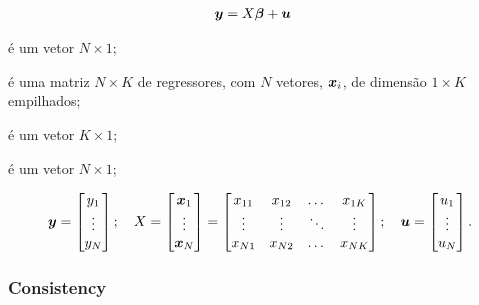 \documentclass[11pt, oneside, a4paper, article]{article}
\numberwithin{equation}{section}
\begin{document}
\vspace{-1 em}
\begin{align} \label{ols:mod:mat}
	\boldsymbol{y} &= X \boldsymbol{\beta} + \boldsymbol{u} 
\end{align}

\begin{description}[noitemsep]
\item [$\mbs{y}$]  é um vetor $N \times 1$;

\item [$X$]  é uma matriz $N \times K$ de regressores, com $N$ vetores, $\boldsymbol{x}_{i}$, de dimensão $1 \times K$ empilhados;

\item [$\mbs{\beta}$] é um vetor $K \times 1$;

\item [$\mbs{u}$] é um vetor $N \times 1$;
\end{description}

\vspace{-1 em}
\begin{align*}
\boldsymbol{y} = 
\begin{bmatrix}
	y_{1} \\ \vdots \\ y_{N}		
\end{bmatrix};
\quad
X = 
\begin{bmatrix}
	\boldsymbol{x}_{1} \\ \vdots \\ \boldsymbol{x}_{N}
\end{bmatrix} = 
\begin{bmatrix}
	x_{11}     & x_{12}     & \dots  & x_{1K} \\          
	\vdots     & \vdots     & \ddots & \vdots \\        
	x_{N1} & x_{N2} & \dots  & x_{NK}		
\end{bmatrix};
\quad
\boldsymbol{u} = 
\begin{bmatrix}
	u_{1} \\ \vdots \\ u_{N}		
\end{bmatrix}.
\end{align*}

\subsubsection{Consistency}
\noindent
\citet[Sec. 4.2.1 -- Consistency; p.52-4]{wool-2010}
\end{document}

